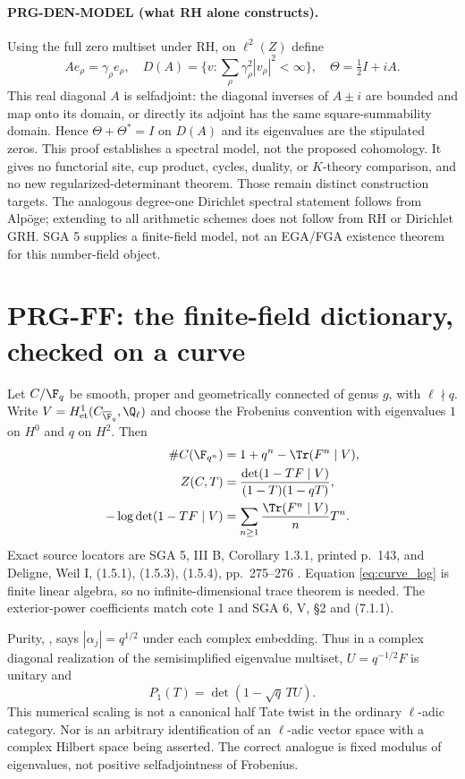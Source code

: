 \paragraph{PRG-DEN-MODEL (what RH alone constructs).}
Using the full zero multiset under RH, on $\ell^2(Z)$ define
\[
 Ae_\rho=\gamma_\rho e_\rho,\quad
 D(A)=\{v:\sum_\rho\gamma_\rho^2|v_\rho|^2<\infty\},\quad
 \Theta=\tfrac12I+iA.
\]
This real diagonal $A$ is selfadjoint: the diagonal inverses of $A\pm i$ are bounded and map onto its domain, or directly its adjoint has the same square-summability domain. Hence $\Theta+\Theta^*=I$ on $D(A)$ and its eigenvalues are the stipulated zeros. This proof establishes a spectral model, not the proposed cohomology. It gives no functorial site, cup product, cycles, duality, or $K$-theory comparison, and no new regularized-determinant theorem. Those remain distinct construction targets. The analogous degree-one Dirichlet spectral statement follows from Alp\"oge; extending to all arithmetic schemes does not follow from RH or Dirichlet GRH. SGA 5 supplies a finite-field model, not an EGA/FGA existence theorem for this number-field object.

\section{PRG-FF: the finite-field dictionary, checked on a curve}
Let $C/\F_q$ be smooth, proper and geometrically connected of genus $g$, with $\ell\nmid q$. Write $V=H^1_{\mathrm{et}}(C_{\overline{\F}_q},\Q_\ell)$ and choose the Frobenius convention with eigenvalues $1$ on $H^0$ and $q$ on $H^2$. Then
\begin{align}
 \#C(\F_{q^n})&=1+q^n-\Tr(F^n\mid V),\label{eq:curve_trace}\\
 Z(C,T)&=\frac{\det(1-TF\mid V)}{(1-T)(1-qT)},\label{eq:curve_det}\\
 -\log\det(1-TF\mid V)&=\sum_{n\ge1}\frac{\Tr(F^n\mid V)}{n}T^n.\label{eq:curve_log}
\end{align}
Exact source locators are SGA 5, III B, Corollary 1.3.1, printed p.~143, and Deligne, Weil I, (1.5.1), (1.5.3), (1.5.4), pp.~275--276 \cite{sga5,weil1}. Equation \eqref{eq:curve_log} is finite linear algebra, so no infinite-dimensional trace theorem is needed. The exterior-power coefficients match cote 1 and SGA 6, V, \S2 and (7.1.1).

Purity, \cite[Theorem (1.6)]{weil1}, says $|\alpha_j|=q^{1/2}$ under each complex embedding. Thus in a complex diagonal realization of the semisimplified eigenvalue multiset, $U=q^{-1/2}F$ is unitary and
\[
 P_1(T)=\det(1-\sqrt q\,T U).
\]
This numerical scaling is not a canonical half Tate twist in the ordinary $\ell$-adic category. Nor is an arbitrary identification of an $\ell$-adic vector space with a complex Hilbert space being asserted. The correct analogue is fixed modulus of eigenvalues, not positive selfadjointness of Frobenius.

